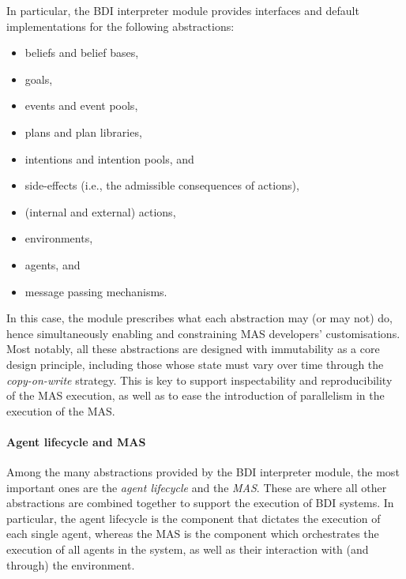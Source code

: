 In particular, the \ac{BDI} interpreter module provides interfaces and default implementations for the following abstractions:
%
\begin{itemize}
    \item beliefs and belief bases,
    \item goals,
    \item events and event pools,
    \item plans and plan libraries,
    \item intentions and intention pools,
    and
    \item side-effects (i.e., the admissible consequences of actions),
    \item (internal and external) actions,
    \item environments,
    \item agents,
    and
    \item message passing mechanisms.
\end{itemize}
%
In this case, the module prescribes what each abstraction may (or may not) do,
hence simultaneously enabling and constraining \ac{MAS} developers' customisations.
%
Most notably, all these abstractions are designed with immutability as a core design principle,
including those whose state must vary over time
through the \emph{copy-on-write} strategy.
%
This is key to support inspectability and reproducibility of the \ac{MAS} execution,
as well as to ease the introduction of parallelism in the execution of the \ac{MAS}.

\paragraph{Agent lifecycle and MAS}

Among the many abstractions provided by the \ac{BDI} interpreter module,
the most important ones are the \emph{agent lifecycle} and the \emph{\ac{MAS}}.
%
These are where all other abstractions are combined together to support the execution of \ac{BDI} systems.
%
In particular, the agent lifecycle is the component that dictates the execution of each single agent,
whereas the \ac{MAS} is the component which orchestrates the execution of all agents in the system,
as well as their interaction with (and through) the environment.

